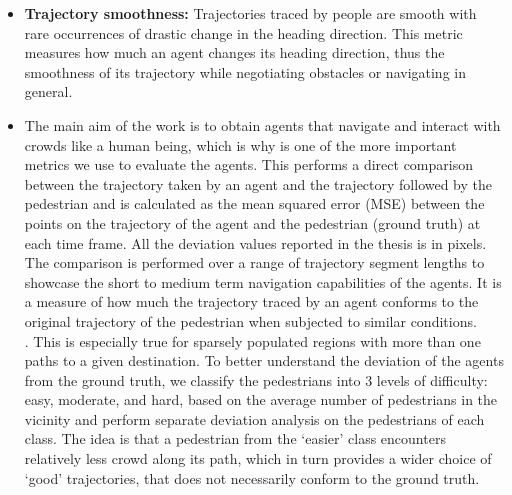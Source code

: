 \begin{itemize}
        \item \textbf{Trajectory smoothness:} Trajectories traced by people are smooth with rare occurrences of drastic change in the heading direction. This metric measures how much an agent changes its heading direction, thus the smoothness of its trajectory while negotiating obstacles or navigating in general.
        \item \textbf{}The main aim of the work is to obtain agents that navigate and interact with crowds like a human being, which is why  is one of the more important metrics we use to evaluate the agents. This performs a direct comparison between the trajectory taken by an agent and the trajectory followed by the pedestrian and is calculated as the mean squared error (MSE) between the points on the trajectory of the agent and the pedestrian (ground truth) at each time frame. All the deviation values reported in the thesis is in pixels. The comparison is performed over a range of trajectory segment lengths to showcase the short to medium term navigation capabilities of the agents. It is a measure of how much the trajectory traced by an agent conforms to the original trajectory of the pedestrian when subjected to similar conditions.\\
        . This is especially true for sparsely populated regions with more than one paths to a given destination. To better understand the deviation of the agents from the ground truth, we classify the pedestrians into 3 levels of difficulty: easy, moderate, and hard, based on the average number of pedestrians in the vicinity and perform separate deviation analysis on the pedestrians of each class. The idea is that a pedestrian from the `easier' class encounters relatively less crowd along its path, which in turn provides a wider choice of `good' trajectories, that does not necessarily conform to the ground truth.

\end{itemize}

